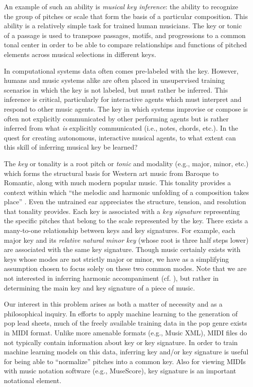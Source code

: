 \documentclass[letterpaper]{article}
\begin{document}
An example of such an ability is \emph{musical key inference}: the ability to recognize the group of pitches or scale that form the basis of a particular composition. This ability is a relatively simple task for trained human musicians. The key or tonic of a passage is used to transpose passages, motifs, and progressions to a common tonal center in order to be able to compare relationships and functions of pitched elements across musical selections in different keys.

In computational systems data often comes pre-labeled with the key. However, humans and music systems alike are often placed in unsupervised training scenarios in which the key is not labeled, but must rather be inferred. This inference is critical, particularly for interactive agents which must interpret and respond to other music agents. The key in which systems improvise or compose is often not explicitly communicated by other performing agents but is rather inferred from what \emph{is} explicitly communicated (i.e., notes, chords, etc.). In the quest for creating autonomous, interactive musical agents, to what extent can this skill of inferring musical key be learned?

The \emph{key} or tonality is a root pitch or \emph{tonic} and modality (e.g., major, minor, etc.) which forms the structural basis for Western art music from Baroque to Romantic, along with much modern popular music. This tonality provides a context within which ``the melodic and harmonic unfolding of a composition takes place'' \cite{vos1996parallel}. Even the untrained ear appreciates the structure, tension, and resolution that tonality provides. Each key is associated with a \emph{key signature} representing the specific pitches that belong to the scale represented by the key. There exists a many-to-one relationship between keys and key signatures. For example, each major key and its \emph{relative natural minor key} (whose root is three half steps lower) are associated with the same key signature. Though music certainly exists with keys whose modes are not strictly major or minor, we have as a simplifying assumption chosen to focus solely on these two common modes. Note that we are not interested in inferring harmonic accompaniment (cf. \cite{groves2013automatic}), but rather in determining the main key and key signature of a piece of music.

Our interest in this problem arises as both a matter of necessity and as a philosophical inquiry. In efforts to apply machine learning to the generation of pop lead sheets, much of the freely available training data in the pop genre exists in MIDI format. Unlike more amenable formats (e.g., Music XML), MIDI files do not typically contain information about key or key signature. In order to train machine learning models on this data, inferring key and/or key signature is useful for being able to ``normalize'' pitches into a common key. Also for viewing MIDIs with music notation software (e.g., MuseScore), key signature is an important notational element.
\end{document}
